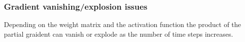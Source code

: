 \documentclass[11pt]{article}
\begin{document}
\begin{figure}[H]
    \centering
\end{figure}

\subsubsection{Gradient vanishing/explosion issues}

Depending on the weight matrix and the activation function the product of the partial graident can vanish or explode as the number of time steps increases.
\end{document}

